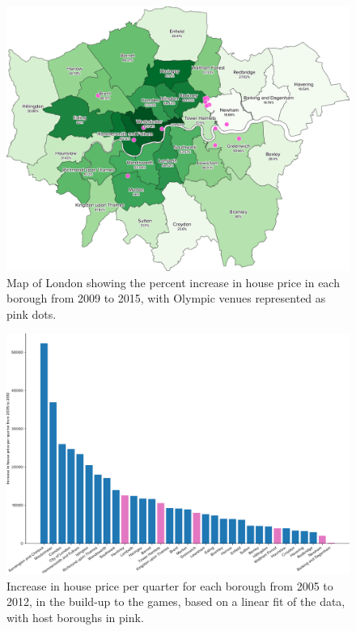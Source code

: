 \documentclass[12pt,twoside]{article}
\begin{document}
\begin{figure}[!htb]
\centering
\includegraphics[width=0.8\linewidth]{figures/house-prices-percent-change-borough.pdf}
\caption{Map of London showing the percent increase in house price in each borough from 2009 to 2015, with Olympic venues represented as pink dots.}
\label{fig:house-prices-percent-change-borough-map}
\end{figure}

\begin{figure}[!htb]
\centering
\includegraphics[width=0.8\linewidth]{figures/house-price-trend-before-olympics.pdf}
\caption{Increase in house price per quarter for each borough from 2005 to 2012, in the build-up to the games, based on a linear fit of the data, with host boroughs in pink.}
\label{fig:house-price-trend-before-olympics}
\end{figure}
\end{document}
